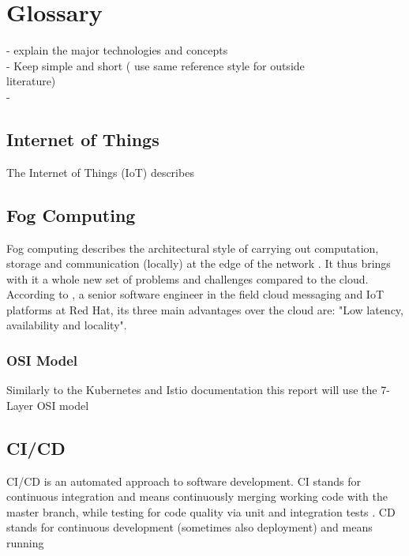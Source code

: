 \section{Glossary}

- explain the major technologies and concepts\\
- Keep simple and short ( use same reference style for outside\\ literature)\\
- 

\subsection{Internet of Things}
The Internet of Things (IoT) describes 

\subsection{Fog Computing}
Fog computing describes the architectural style of carrying out computation, storage and communication (locally) at the edge of the network \citep{fogComputing:def}. It thus brings with it a whole new set of problems and challenges compared to the cloud. According to \citep{Introducing:kubeedge}, a senior software engineer in the field cloud messaging and IoT platforms at Red Hat, its three main advantages over the cloud are: "Low latency, availability and locality". 

\subsubsection{OSI Model}
Similarly to the Kubernetes and Istio documentation this report will use the 7-Layer OSI model \cite{IstioLayers61:online}


\subsection{CI/CD}
CI/CD is an automated approach to software development. CI stands for continuous integration and means continuously merging working code with the master branch, while testing for code quality via unit and integration tests \citep{shahin2017continuous}. CD stands for continuous development (sometimes also deployment) and means running 
